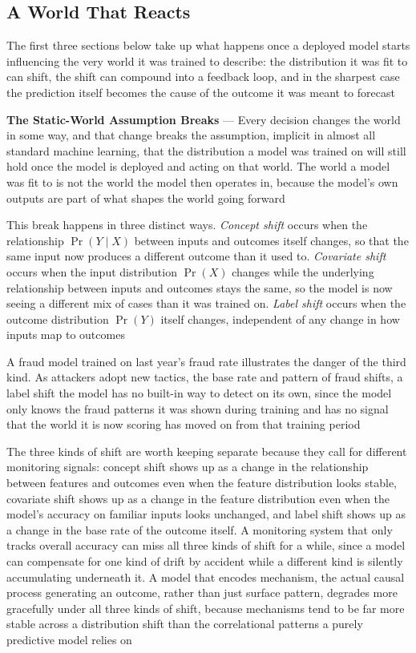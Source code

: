 \subsection{A World That Reacts}
\label{sec:world-that-reacts}

The first three sections below take up what happens once a deployed model starts
influencing the very world it was trained to describe: the distribution it was
fit to can shift, the shift can compound into a feedback loop, and in the
sharpest case the prediction itself becomes the cause of the outcome it was
meant to forecast

\textbf{The Static-World Assumption Breaks} --- Every decision changes the world
in some way, and that change breaks the assumption, implicit in almost all
standard machine learning, that the distribution a model was trained on will still
hold once the model is deployed and acting on that world. The world a model was
fit to is not the world the model then operates in, because the model's own outputs
are part of what shapes the world going forward

This break happens in three distinct ways. \emph{Concept shift} occurs when the
relationship $\Pr(Y \mid X)$ between inputs and outcomes itself changes, so that
the same input now produces a different outcome than it used to. \emph{Covariate
shift} occurs when the input distribution $\Pr(X)$ changes while the underlying relationship
between inputs and outcomes stays the same, so the model is now seeing a
different mix of cases than it was trained on. \emph{Label shift} occurs when
the outcome distribution $\Pr(Y)$ itself changes, independent of any change in how
inputs map to outcomes

A fraud model trained on last year's fraud rate illustrates the danger of the
third kind. As attackers adopt new tactics, the base rate and pattern of fraud
shifts, a label shift the model has no built-in way to detect on its own, since
the model only knows the fraud patterns it was shown during training and has no
signal that the world it is now scoring has moved on from that training period

The three kinds of shift are worth keeping separate because they call for different
monitoring signals: concept shift shows up as a change in the relationship
between features and outcomes even when the feature distribution looks stable, covariate
shift shows up as a change in the feature distribution even when the model's accuracy
on familiar inputs looks unchanged, and label shift shows up as a change in the
base rate of the outcome itself. A monitoring system that only tracks overall accuracy
can miss all three kinds of shift for a while, since a model can compensate for
one kind of drift by accident while a different kind is silently accumulating
underneath it. A model that encodes mechanism, the actual causal process
generating an outcome, rather than just surface pattern, degrades more
gracefully under all three kinds of shift, because mechanisms tend to be far more
stable across a distribution shift than the correlational patterns a purely predictive
model relies on


